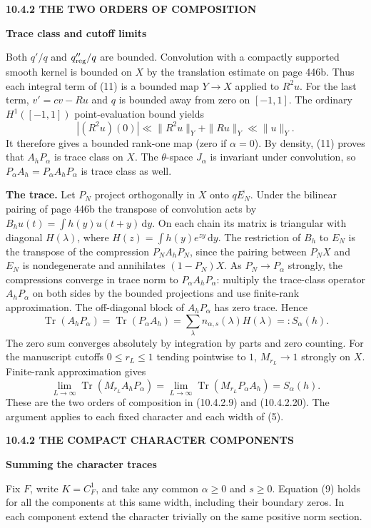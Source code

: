\documentclass[11pt,letterpaper]{article}
\newcommand{\rightmarktext}{}
\newcommand{\printfolio}{}
\newcommand{\leaf}[4]{\clearpage\gdef\printfolio{#1}\gdef\rightmarktext{#2}%
  {\small\sffamily\bfseries\color{ink}#3\par}\vspace{3pt}%
  {\LARGE\bfseries #4\par}\vspace{5pt}}
\newcommand{\point}[1]{\par\smallskip\textbf{#1.}\enspace\ignorespaces}
\newcommand{\dd}{\,\mathrm d}
\DeclareMathOperator{\Tr}{Tr}
\begin{document}
\leaf{463a}{The spectral trace}{10.4.2 \quad THE TWO ORDERS OF COMPOSITION}{Trace class and cutoff limits}
Both $q'/q$ and $q''_{\rm reg}/q$ are bounded. Convolution with a compactly
supported smooth kernel is bounded on $X$ by the translation estimate
on page 446b. Thus each integral term of (11) is a bounded map $Y\to X$
applied to $R^2u$. For the last term,
$v'=cv-Ru$ and $q$ is bounded away from zero on $[-1,1]$. The ordinary
$H^1([-1,1])$ point-evaluation bound yields
\[
 |(R^2u)(0)|\ll\|R^2u\|_Y+\|Ru\|_Y\ll\|u\|_Y .
\]
It therefore gives a bounded rank-one map (zero if $\alpha=0$).
By density, (11) proves that $A_hP_\alpha$ is trace class on $X$.
The $\theta$-space $J_\alpha$ is invariant under convolution, so
$P_\alpha A_h=P_\alpha A_hP_\alpha$ is trace class as well.

\point{The trace} Let $P_N$ project orthogonally in $X$ onto
$q\overline{E_N}$. Under the bilinear pairing of page 446b the transpose
of convolution acts by $B_hu(t)=\int h(y)u(t+y)\dd y$. On each chain its
matrix is triangular with diagonal $H(\lambda)$, where
$H(z)=\int h(y)e^{zy}\dd y$. The restriction of $B_h$ to $E_N$ is the
transpose of the compression $P_N A_h P_N$, since the pairing between
$P_N X$ and $E_N$ is nondegenerate and annihilates $(1-P_N)X$.
As $P_N\to P_\alpha$ strongly, the compressions converge in trace norm to
$P_\alpha A_hP_\alpha$: multiply the trace-class operator $A_hP_\alpha$
on both sides by the bounded projections and use finite-rank approximation.
The off-diagonal block of $A_hP_\alpha$ has zero trace. Hence
\[
 \Tr(A_hP_\alpha)=\Tr(P_\alpha A_h)
       =\sum_\lambda n_{\alpha,s}(\lambda) H(\lambda)=:S_\alpha(h).
 \tag{12}
\]
The zero sum converges absolutely by integration by parts and zero counting.
For the manuscript cutoffs $0\le r_L\le1$ tending pointwise to $1$,
$M_{r_L}\to1$ strongly on $X$. Finite-rank approximation gives
\[
 \lim_{L\to\infty}\Tr(M_{r_L} A_hP_\alpha)
 =\lim_{L\to\infty}\Tr(M_{r_L} P_\alpha A_h)=S_\alpha(h).
 \tag{13}
\]
These are the two orders of composition in (10.4.2.9) and (10.4.2.20).
The argument applies to each fixed character and each width of (5).

\leaf{463b}{The spectral trace}{10.4.2 \quad THE COMPACT CHARACTER COMPONENTS}{Summing the character traces}
Fix $F$, write $K=C_F^1$, and take any common $\alpha\ge0$ and $s\ge0$.
Equation (9) holds for all the components at this same width, including
their boundary zeros. In each component extend the character trivially
on the same positive norm section.
\end{document}
